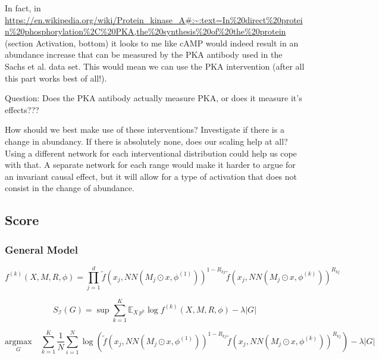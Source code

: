 \documentclass{article}
\begin{document}
In fact, in \url{https://en.wikipedia.org/wiki/Protein_kinase_A#:~:text=In%20direct%20protein%20phosphorylation%2C%20PKA,the%20synthesis%20of%20the%20protein} (section Activation, bottom) it looks to me like cAMP would indeed result in an abundance increase that can be measured by the PKA antibody used in the Sachs et al. data set. This would mean we can use the PKA intervention (after all this part works best of all!).

Question: Does the PKA antibody actually measure PKA, or does it measure it's effects???

How should we best make use of these interventions? Investigate if there is a change in abundancy. If there is absolutely none, does our scaling help at all?
Using a different network for each interventional distribution could help us cope with that. A separate network for each range would make it harder to argue for an invariant causal effect, but it will allow for a type of activation that does not consist in the change of abundance.

\subsection{Score}

    

\subsubsection{General Model}
\begin{equation}
    f^{(k)}(X, M, R, \phi) = \prod_{j=1}^{d} \tilde{f}(x_j, NN(M_j \odot x, \phi^{(1)}))^{1-R_{kj}} \tilde{f}(x_j, NN(M_j \odot x, \phi^{(k)}))^{R_{kj}}
\end{equation}

\begin{equation}
    S_{\mathcal{I}}(G) = \sup \sum_{k=1}^K \mathbb{E}_{X ~ p^{k}} \log f^{(k)}(X, M, R, \phi) - \lambda |G|
\end{equation}

\begin{equation}
    \underset{G}{\mathrm{argmax}} \quad \sum_{k=1}^K \frac{1}{N} \sum_{i=1}^N \log(\tilde{f}(x_j, NN(M_j \odot x, \phi^{(1)}))^{1-R_{kj}} \tilde{f}(x_j, NN(M_j \odot x, \phi^{(k)}))^{R_{kj}}) - \lambda |G|
\end{equation}
\end{document}
